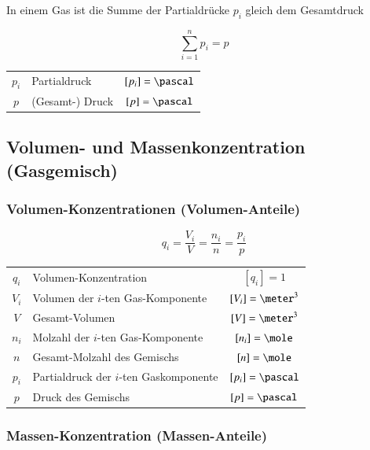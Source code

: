 In einem Gas ist die Summe der Partialdrücke $p_i$ gleich dem Gesamtdruck 

\begin{minipage}[c]{0.38\columnwidth}
	$$ \boxed{ \sum_{i=1}^n  p_i = p } $$
\end{minipage}
\hfill
\begin{minipage}[c]{0.58\columnwidth}
	\begin{tabular}{c l c}
		$p_i$	& Partialdruck 		& $[p_i] = \pascal$	\\
		$p$ 	& (Gesamt-) Druck 	& $[p] = \pascal$ 	
	\end{tabular}
\end{minipage}
 


\subsection{Volumen- und Massenkonzentration (Gasgemisch)}

\subsubsection{Volumen-Konzentrationen (Volumen-Anteile)}

\vspace{-0.2cm}

$$ \boxed{  q_i = \frac{V_i}{V} = \frac{n_i}{n} = \frac{p_i}{p} } $$


\begin{tabular}{c l c}
	$q_i$ 	& Volumen-Konzentration						& $[q_i] = 1$ 			\\
	$V_i$ 	& Volumen der $i$-ten Gas-Komponente 		& $[V_i] = \meter^3$ 	\\
	$V$ 	& Gesamt-Volumen	 						& $[V] = \meter^3$ 		\\
	$n_i$ 	& Molzahl der $i$-ten Gas-Komponente 		& $[n_i] = \mole$ 		\\
	$n$ 	& Gesamt-Molzahl des Gemischs 				& $[n] = \mole$ 		\\
	$p_i$ 	& Partialdruck der $i$-ten Gaskomponente 	& $[p_i] = \pascal$ 	\\
	$p$ 	& Druck des Gemischs 						& $[p] = \pascal$
\end{tabular}


\subsubsection{Massen-Konzentration (Massen-Anteile)}

\vspace{-0.2cm}


